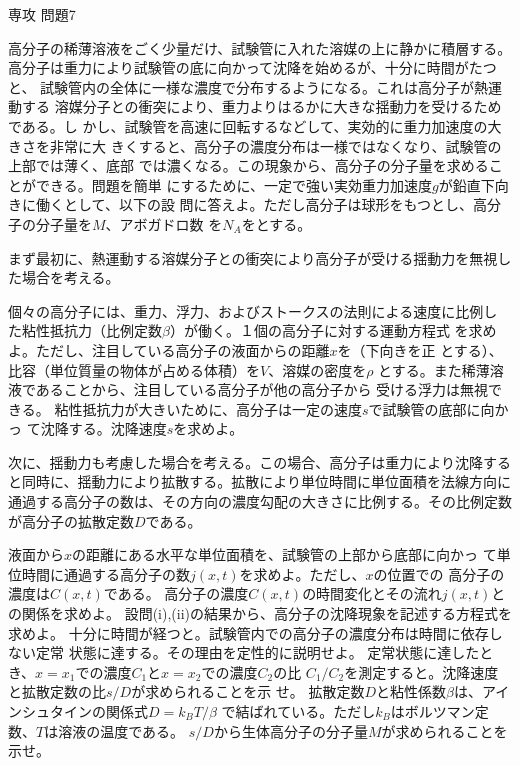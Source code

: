 \documentclass[fleqn]{jbook}
\begin{document}
\begin{question}{専攻 問題7}{}

高分子の稀薄溶液をごく少量だけ、試験管に入れた溶媒の上に静かに積層する。
高分子は重力により試験管の底に向かって沈降を始めるが、十分に時間がたつと、
試験管内の全体に一様な濃度で分布するようになる。これは高分子が熱運動する
溶媒分子との衝突により、重力よりはるかに大きな揺動力を受けるためである。し
かし、試験管を高速に回転するなどして、実効的に重力加速度の大きさを非常に大
きくすると、高分子の濃度分布は一様ではなくなり、試験管の上部では薄く、底部
では濃くなる。この現象から、高分子の分子量を求めることができる。問題を簡単
にするために、一定で強い実効重力加速度$g$が鉛直下向きに働くとして、以下の設
問に答えよ。ただし高分子は球形をもつとし、高分子の分子量を$M$、アボガドロ数
を$N_A$をとする。
\begin{subquestions}
\SubQuestion
  まず最初に、熱運動する溶媒分子との衝突により高分子が受ける揺動力を無視し
  た場合を考える。
  \begin{subsubquestions}
  \SubSubQuestion
    個々の高分子には、重力、浮力、およびストークスの法則による速度に比例し
    た粘性抵抗力（比例定数$\beta$）が働く。１個の高分子に対する運動方程式
    を求めよ。ただし、注目している高分子の液面からの距離$x$を（下向きを正
    とする）、比容（単位質量の物体が占める体積）を$V$、溶媒の密度を$\rho$
    とする。また稀薄溶液であることから、注目している高分子が他の高分子から
    受ける浮力は無視できる。
  \SubSubQuestion
    粘性抵抗力が大きいために、高分子は一定の速度$s$で試験管の底部に向かっ
    て沈降する。沈降速度$s$を求めよ。
  \end{subsubquestions}

\SubQuestion
  次に、揺動力も考慮した場合を考える。この場合、高分子は重力により沈降する
  と同時に、揺動力により拡散する。拡散により単位時間に単位面積を法線方向に
  通過する高分子の数は、その方向の濃度勾配の大きさに比例する。その比例定数
  が高分子の拡散定数$D$である。
  \begin{subsubquestions}
  \SubSubQuestion
    液面から$x$の距離にある水平な単位面積を、試験管の上部から底部に向かっ
    て単位時間に通過する高分子の数$j(x,t)$を求めよ。ただし、$x$の位置での
    高分子の濃度は$C(x,t)$である。
  \SubSubQuestion
    高分子の濃度$C(x,t)$の時間変化とその流れ$j(x,t)$との関係を求めよ。
  \SubSubQuestion
    設問(i),(ii)の結果から、高分子の沈降現象を記述する方程式を求めよ。
  \SubSubQuestion
    十分に時間が経つと。試験管内での高分子の濃度分布は時間に依存しない定常
    状態に達する。その理由を定性的に説明せよ。
  \SubSubQuestion
    定常状態に達したとき、$x=x_1$での濃度$C_1$と$x=x_2$での濃度$C_2$の比
    $C_1/C_2$を測定すると。沈降速度と拡散定数の比$s/D$が求められることを示
    せ。
  \SubSubQuestion
    拡散定数$D$と粘性係数$\beta$は、アインシュタインの関係式$D=k_BT/\beta$
    で結ばれている。ただし$k_B$はボルツマン定数、$T$は溶液の温度である。
    $s/D$から生体高分子の分子量$M$が求められることを示せ。
  \end{subsubquestions}
\end{subquestions}


\end{question}
\end{document}

